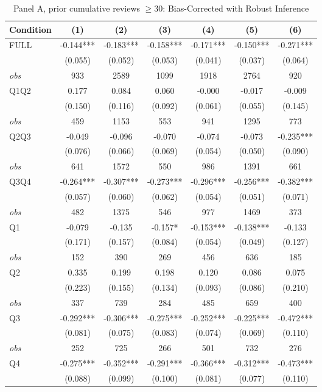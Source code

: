 \begin{table}[!htbp]
\centering
\caption{Panel A, prior cumulative reviews $\geq30$: Bias-Corrected with Robust Inference}
\begin{tabular}{lcccccc}
\toprule
Condition & (1) & (2) & (3) & (4) & (5) & (6) \\
\midrule
FULL & -0.144*** & -0.183*** & -0.158*** & -0.171*** & -0.150*** & -0.271*** \\
 & (0.055) & (0.052) & (0.053) & (0.041) & (0.037) & (0.064) \\
\textit{obs} & 933 & 2589 & 1099 & 1918 & 2764 & 920 \\
Q1Q2 & 0.177 & 0.084 & 0.060 & -0.000 & -0.017 & -0.009 \\
 & (0.150) & (0.116) & (0.092) & (0.061) & (0.055) & (0.145) \\
\textit{obs} & 459 & 1153 & 553 & 941 & 1295 & 773 \\
Q2Q3 & -0.049 & -0.096 & -0.070 & -0.074 & -0.073 & -0.235*** \\
 & (0.076) & (0.066) & (0.069) & (0.054) & (0.050) & (0.090) \\
\textit{obs} & 641 & 1572 & 550 & 986 & 1391 & 661 \\
Q3Q4 & -0.264*** & -0.307*** & -0.273*** & -0.296*** & -0.256*** & -0.382*** \\
 & (0.057) & (0.060) & (0.062) & (0.054) & (0.051) & (0.071) \\
\textit{obs} & 482 & 1375 & 546 & 977 & 1469 & 373 \\
Q1 & -0.079 & -0.135 & -0.157* & -0.153*** & -0.138*** & -0.133 \\
 & (0.171) & (0.157) & (0.084) & (0.054) & (0.049) & (0.127) \\
\textit{obs} & 152 & 390 & 269 & 456 & 636 & 185 \\
Q2 & 0.335 & 0.199 & 0.198 & 0.120 & 0.086 & 0.075 \\
 & (0.223) & (0.155) & (0.134) & (0.093) & (0.086) & (0.210) \\
\textit{obs} & 337 & 739 & 284 & 485 & 659 & 400 \\
Q3 & -0.292*** & -0.306*** & -0.275*** & -0.252*** & -0.225*** & -0.472*** \\
 & (0.081) & (0.075) & (0.083) & (0.074) & (0.069) & (0.110) \\
\textit{obs} & 252 & 725 & 266 & 501 & 732 & 276 \\
Q4 & -0.275*** & -0.352*** & -0.291*** & -0.366*** & -0.312*** & -0.473*** \\
 & (0.088) & (0.099) & (0.100) & (0.081) & (0.077) & (0.110) \\

\end{tabular}
\end{table}
